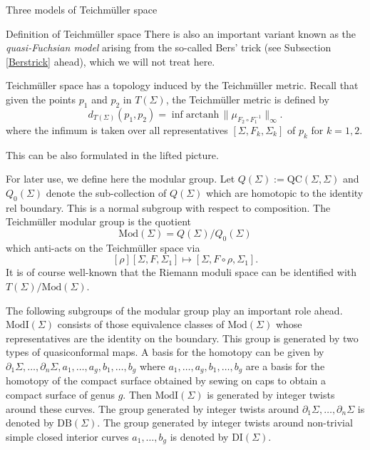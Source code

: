 \documentclass[12pt]{amsart}
\newcommand{\riem}{\Sigma}  %
\theoremstyle{plain}
\theoremstyle{definition}
\theoremstyle{remark}
\numberwithin{equation}{section} %
\numberwithin{figure}{section} %
\begin{document}
\begin{section}{Three models of Teichm\"uller space}
\begin{subsection}{Definition of Teichm\"uller space}
 There is also an important variant known as the {\it quasi-Fuchsian model} arising from the so-called Bers' trick (see Subsection \ref{Berstrick} ahead), which we will not treat here.  

 Teichm\"uller space has a topology induced by the Teichm\"uller metric. 
 Recall that given the points $p_1$ and $p_2$ in \(T(\riem)\), the Teichmüller metric
is defined by
\begin{equation}\label{Teichmetric}
    d_{T(\riem)}(p_1, p_2) = \inf \mathrm{arctanh} \, \| \mu_{F_2 \circ F_1^{-1}} \|_\infty  .
\end{equation} 
where the infimum is taken over all representatives $[\riem,F_k,\riem_k]$ of $p_k$ for $k=1,2$.

This can be also formulated in the lifted picture. 

For later use, we define here the modular group. 
Let $Q(\riem):=\mathrm{QC}(\riem, \riem)$ and $Q_0(\riem)$ denote the sub-collection of $Q(\riem)$ which are homotopic to the identity rel boundary. This is a normal subgroup with respect to composition. The Teichm\"uller modular group is the quotient 
\[ \mathrm{Mod}(\riem) = Q(\riem)/Q_0(\riem) \]
which anti-acts on the Teichm\"uller space via
\[  [\rho][\riem,F,\riem_1] \mapsto [\riem,F \circ \rho,\riem_1].   \]
It is of course well-known that the Riemann moduli space can be identified with $T(\riem)/\mathrm{Mod}(\riem)$.

The following subgroups of the modular group play an important role ahead.  $\mathrm{ModI}(\riem)$ consists of those equivalence classes of $\mathrm{Mod}(\riem)$ whose representatives are the identity on the boundary.  This group is generated by two types of quasiconformal maps. A basis for the homotopy can be given by $\partial_1 \riem,\ldots,\partial_n\riem,a_1,\ldots,a_g,b_1,\ldots,b_g$ where $a_1,\ldots,a_g,b_1,\ldots,b_g$ are a basis for the homotopy of the compact surface obtained by sewing on caps to obtain a compact surface of genus $g$. Then $\mathrm{ModI}(\riem)$ is generated by integer twists around these curves. 
The group generated by integer twists around $\partial_1 \riem,\ldots,\partial_n \riem$ is denoted by $\mathrm{DB}(\riem)$.  The group generated by integer twists around non-trivial simple closed interior curves $a_1,\ldots,b_g$ is denoted by $\mathrm{DI}(\riem)$. 


\end{subsection}
\end{section}
\end{document}
